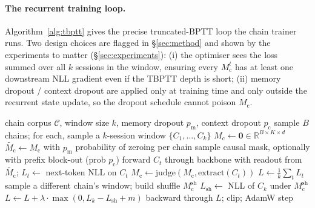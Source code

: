 \documentclass{article}
\newcommand{\Mc}{M_{\text{c}}}
\begin{document}
\paragraph{The recurrent training loop.}
Algorithm~\ref{alg:tbptt} gives the precise truncated-BPTT loop the
chain trainer runs. Two design choices are flagged in
\S\ref{sec:method} and shown by the experiments to matter
(\S\ref{sec:experiments}): (i) the optimiser sees the loss summed
over all $k$ sessions in the window, ensuring every $\Mc^t$ has at
least one downstream NLL gradient even if the TBPTT depth is short;
(ii) memory dropout / context dropout are applied only at training
time and only outside the recurrent state update, so the dropout
schedule cannot poison $\Mc$.

\begin{algorithm}[t]
\caption{Recurrent chain training step (one micro-batch).}
\label{alg:tbptt}
\begin{algorithmic}[1]
\Require chain corpus $\mathcal{C}$, window size $k$, memory dropout
$p_\text{m}$, context dropout $p_\text{c}$
\State sample $B$ chains; for each, sample a $k$-session window
$\{C_1, \dots, C_k\}$
\State $\Mc \gets \mathbf{0} \in \mathbb{R}^{B\times K\times d}$
  \State $\tilde{\Mc} \gets \Mc$ with $p_\text{m}$ probability of zeroing per chain
  \State sample causal mask, optionally with prefix block-out (prob $p_\text{c}$)
  \State forward $C_t$ through backbone with readout from $\tilde{\Mc}$;
         $L_t \gets$ next-token NLL on $C_t$
  \State $\Mc \gets \mathrm{judge}(\Mc, \mathrm{extract}(C_t))$
\EndFor
\State $L \gets \frac{1}{k} \sum_t L_t$
  \State sample a different chain's window; build shuffle $\Mc^{\text{sh}}$
  \State $L_{\text{sh}} \gets$ NLL of $C_k$ under $\Mc^{\text{sh}}$
  \State $L \gets L + \lambda \cdot \max(0, L_k - L_{\text{sh}} + m)$
\EndIf
\State backward through $L$; clip; AdamW step
\end{algorithmic}
\end{algorithm}
\end{document}
